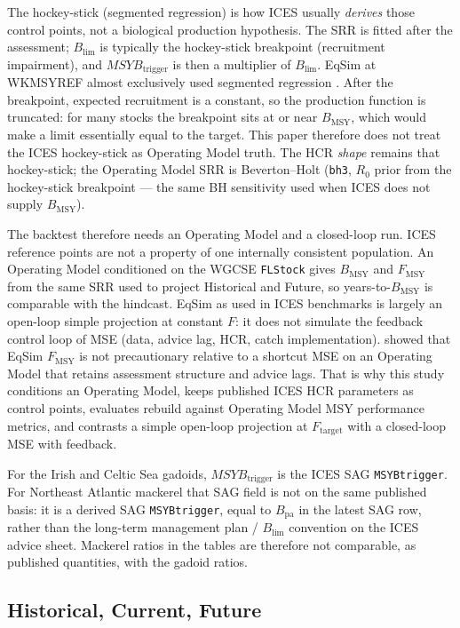 \documentclass[11pt,a4paper]{article}
\newcommand{\Fmsy}{F_{\mathrm{MSY}}}
\newcommand{\Blim}{B_{\lim}}
\newcommand{\Btrig}{MSYB_{\mathrm{trigger}}}
\newcommand{\Bmsy}{B_{\mathrm{MSY}}}
\begin{document}
The hockey-stick (segmented regression) is how ICES usually
\emph{derives} those control points, not a biological production
hypothesis. The SRR is fitted after the assessment; $\Blim$ is typically
the hockey-stick breakpoint (recruitment impairment), and
$MSYB_{\mathrm{trigger}}$ is then a multiplier of $\Blim$. EqSim at
WKMSYREF almost exclusively used segmented regression
\citep{winker2026rebuilding}. After the breakpoint, expected recruitment
is a constant, so the production function is truncated: for many stocks
the breakpoint sits at or near $\Bmsy$, which would make a limit
essentially equal to the target. This paper therefore does not treat the
ICES hockey-stick as Operating Model truth. The HCR \emph{shape} remains
that hockey-stick; the Operating Model SRR is Beverton--Holt (\texttt{bh3}, $R_0$
prior from the hockey-stick breakpoint --- the same BH sensitivity
\citet{winker2026rebuilding} used when ICES does not supply $\Bmsy$).

The backtest therefore needs an Operating Model and a closed-loop run.
ICES reference points are not a property of one internally consistent
population. An Operating Model conditioned on the WGCSE \texttt{FLStock} gives
$\Bmsy$ and $\Fmsy$ from the same SRR used to project Historical and
Future, so years-to-$\Bmsy$ is comparable with the hindcast. EqSim as
used in ICES benchmarks is largely an open-loop simple projection at
constant $F$: it does not simulate the feedback control loop of MSE
(data, advice lag, HCR, catch implementation).
\citet{winker2025precautionary} showed that EqSim $\Fmsy$ is not
precautionary relative to a shortcut MSE on an Operating Model that retains
assessment structure and advice lags. That is why this study conditions
an Operating Model, keeps published ICES HCR parameters as control points, evaluates
rebuild against Operating Model MSY performance metrics, and contrasts a simple
open-loop projection at $F_{\mathrm{target}}$ with a closed-loop MSE
with feedback.

For the Irish and Celtic Sea gadoids, $\Btrig$ is the ICES SAG
\texttt{MSYBtrigger}. For Northeast Atlantic mackerel that SAG field is
not on the same published basis: it is a derived SAG
\texttt{MSYBtrigger}, equal to $B_{\mathrm{pa}}$ in the latest SAG row,
rather than the long-term management plan / $\Blim$ convention on the
ICES advice sheet. Mackerel ratios in the tables are therefore not
comparable, as published quantities, with the gadoid ratios.

\subsection{Historical, Current, Future}
\label{sec:framework}
\end{document}
